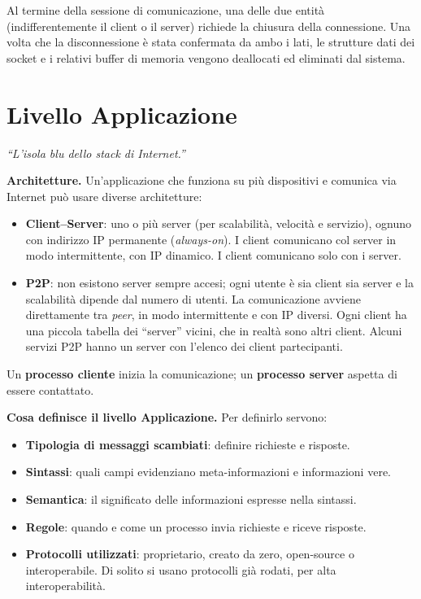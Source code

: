 \documentclass[11pt,a4paper]{report}
\newcommand{\pagemark}[1]{\marginpar{\footnotesize\color{gray}p.#1}}
\begin{document}
Al termine della sessione di comunicazione, una delle due entità (indifferentemente il client o il server) richiede la chiusura della connessione. Una volta che la disconnessione è stata confermata da ambo i lati, le strutture dati dei socket e i relativi buffer di memoria vengono deallocati ed eliminati dal sistema.

\chapter{Livello Applicazione}\pagemark{31}
\emph{``L'isola blu dello stack di Internet.''}

\textbf{Architetture.} Un'applicazione che funziona su più dispositivi e comunica via Internet può usare diverse architetture:
\begin{itemize}[noitemsep]
\item \textbf{Client--Server}: uno o più server (per scalabilità, velocità e servizio), ognuno con indirizzo IP permanente (\emph{always-on}). I client comunicano col server in modo intermittente, con IP dinamico. I client comunicano solo con i server.
\item \textbf{P2P}: non esistono server sempre accesi; ogni utente è sia client sia server e la scalabilità dipende dal numero di utenti. La comunicazione avviene direttamente tra \emph{peer}, in modo intermittente e con IP diversi. Ogni client ha una piccola tabella dei ``server'' vicini, che in realtà sono altri client. Alcuni servizi P2P hanno un server con l'elenco dei client partecipanti.
\end{itemize}
Un \textbf{processo cliente} inizia la comunicazione; un \textbf{processo server} aspetta di essere contattato.

\textbf{Cosa definisce il livello Applicazione.} Per definirlo servono:
\begin{itemize}[noitemsep]
\item \textbf{Tipologia di messaggi scambiati}: definire richieste e risposte.
\item \textbf{Sintassi}: quali campi evidenziano meta-informazioni e informazioni vere.
\item \textbf{Semantica}: il significato delle informazioni espresse nella sintassi.
\item \textbf{Regole}: quando e come un processo invia richieste e riceve risposte.
\item \textbf{Protocolli utilizzati}: proprietario, creato da zero, open-source o interoperabile. Di solito si usano protocolli già rodati, per alta interoperabilità.
\end{itemize}
\end{document}
